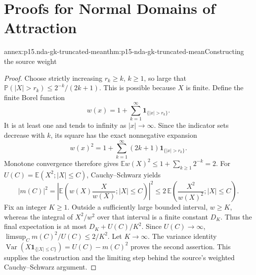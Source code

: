 \section{Proofs for Normal Domains of Attraction}
\label{sec:annex-p15-normal-domains-of-attraction}

\begin{annexitem}{annex:p15.nda-gk-truncated-mean}{thm:p15-nda-gk-truncated-mean}{Constructing the source weight}
\begin{proof}
Choose strictly increasing \(r_k\geq k\), \(k\geq1\), so large that
\(\mathbb P(|X|>r_k)\leq2^{-k}/(2k+1)\).
This is possible because \(X\) is finite.
Define the finite Borel function
\[
 w(x)=1+\sum_{k=1}^\infty\mathbf1_{\{|x|>r_k\}}.
 \]
It is at least one and tends to infinity as \(|x|\to\infty\).
Since the indicator sets decrease with \(k\), its square has
the exact nonnegative expansion
\[
 w(x)^2=1+\sum_{k=1}^\infty(2k+1)\mathbf1_{\{|x|>r_k\}}.
 \]
Monotone convergence therefore gives
\(\mathbb Ew(X)^2\leq1+\sum_{k\geq1}2^{-k}=2\).
For \(U(C)=\mathbb E(X^2;|X|\leq C)\), Cauchy--Schwarz yields
\[
 |m(C)|^2
 =\left|\mathbb E\left(w(X)\frac{X}{w(X)};|X|\leq C\right)\right|^2
 \leq2\,\mathbb E\left(\frac{X^2}{w(X)^2};|X|\leq C\right).
 \]
Fix an integer \(K\geq1\). Outside a sufficiently large bounded
interval, \(w\geq K\), whereas the integral of \(X^2/w^2\)
over that interval is a finite constant \(D_K\).
Thus the final expectation is at most \(D_K+U(C)/K^2\).
Since \(U(C)\to\infty\),
\(\limsup_Cm(C)^2/U(C)\leq2/K^2\).
Let \(K\to\infty\). The variance identity
\(\operatorname{Var}(X\mathbf1_{\{|X|\leq C\}})
=U(C)-m(C)^2\) proves the second assertion.
This supplies the construction and the limiting step behind the
source's weighted Cauchy--Schwarz argument.
\end{proof}
\end{annexitem}

